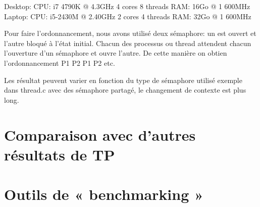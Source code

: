 \documentclass[12pt]{article}
\begin{document}
Desktop: CPU: i7 4790K @ 4.3GHz 4 cores 8 threads RAM: 16Go @ 1 600MHz
Laptop: CPU: i5-2430M @ 2.40GHz 2 cores 4 threads RAM: 32Go @ 1 600MHz

Pour faire l'ordonnancement, nous avons utilisé deux sémaphore: un est ouvert
et l'autre bloqué à l'état initial. Chacun des processus ou thread attendent
chacun l'ouverture d'un sémaphore et ouvre l'autre. De cette manière on obtien
l'ordonnancement P1 P2 P1 P2 etc.

Les résultat peuvent varier en fonction du type de sémaphore utilisé exemple
dans thread.c avec des sémaphore partagé, le changement de contexte est plus
long.

\section{Comparaison avec d'autres résultats de TP}

\section{Outils de « benchmarking »}
\end{document}
